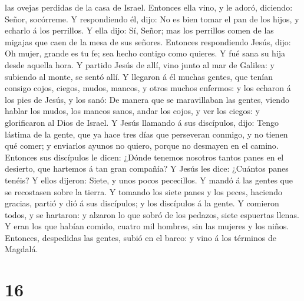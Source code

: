 las ovejas perdidas de la casa de Israel.  Entonces ella
vino, y le adoró, diciendo: Señor, socórreme.  Y
respondiendo él, dijo: No es bien tomar el pan de los hijos, y echarlo á
los perrillos.  Y ella dijo: Sí, Señor; mas los perrillos
comen de las migajas que caen de la mesa de sus señores. 
Entonces respondiendo Jesús, dijo: Oh mujer, grande es tu fe; sea hecho
contigo como quieres. Y fué sana su hija desde aquella hora.
 Y partido Jesús de allí, vino junto al mar de Galilea: y
subiendo al monte, se sentó allí.  Y llegaron á él muchas
gentes, que tenían consigo cojos, ciegos, mudos, mancos, y otros muchos
enfermos: y los echaron á los pies de Jesús, y los sanó: 
De manera que se maravillaban las gentes, viendo hablar los mudos, los
mancos sanos, andar los cojos, y ver los ciegos: y glorificaron al Dios
de Israel.  Y Jesús llamando á sus discípulos, dijo:
Tengo lástima de la gente, que ya hace tres días que perseveran conmigo,
y no tienen qué comer; y enviarlos ayunos no quiero, porque no desmayen
en el camino.  Entonces sus discípulos le dicen: ¿Dónde
tenemos nosotros tantos panes en el desierto, que hartemos á tan gran
compañía?  Y Jesús les dice: ¿Cuántos panes tenéis? Y
ellos dijeron: Siete, y unos pocos pececillos.  Y mandó á
las gentes que se recostasen sobre la tierra.  Y tomando
los siete panes y los peces, haciendo gracias, partió y dió á sus
discípulos; y los discípulos á la gente.  Y comieron
todos, y se hartaron: y alzaron lo que sobró de los pedazos, siete
espuertas llenas.  Y eran los que habían comido, cuatro
mil hombres, sin las mujeres y los niños.  Entonces,
despedidas las gentes, subió en el barco: y vino á los términos de
Magdalá.

\hypertarget{section-15}{%
\section{16}\label{section-15}}

